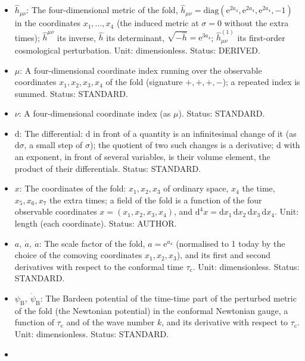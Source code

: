 \documentclass[
  10pt,
]{article}
\providecommand{\tightlist}{%
  \setlength{\itemsep}{0pt}\setlength{\parskip}{0pt}}
\begin{document}
\begin{itemize}
\tightlist
\item
  \(\hat h_{\mu\nu}\): The four-dimensional metric of the fold,
  \(\hat h_{\mu\nu} = \mathrm{diag}(\mathrm{e}^{2a_4}, \mathrm{e}^{2a_4}, \mathrm{e}^{2a_4}, -1)\)
  in the coordinates \(x_1, \dots, x_4\) (the induced metric at
  \(\sigma = 0\) without the extra times); \(\hat h^{\mu\nu}\) its
  inverse, \(\hat h\) its determinant,
  \(\sqrt{-\hat h} = \mathrm{e}^{3a_4}\); \(\hat h^{(1)}_{\mu\nu}\) its
  first-order cosmological perturbation. Unit: dimensionless. Status:
  DERIVED.
\item
  \(\mu\): A four-dimensional coordinate index running over the
  observable coordinates \(x_1, x_2, x_3, x_4\) of the fold (signature
  \(+,+,+,-\)); a repeated index is summed. Status: STANDARD.
\item
  \(\nu\): A four-dimensional coordinate index (as \(\mu\)). Status:
  STANDARD.
\item
  \(\mathrm{d}\): The differential: \(\mathrm{d}\) in front of a
  quantity is an infinitesimal change of it (as \(\mathrm{d}\sigma\), a
  small step of \(\sigma\)); the quotient of two such changes is a
  derivative; \(\mathrm{d}\) with an exponent, in front of several
  variables, is their volume element, the product of their
  differentials. Status: STANDARD.
\item
  \(x\): The coordinates of the fold: \(x_1, x_2, x_3\) of ordinary
  space, \(x_4\) the time, \(x_5, x_6, x_7\) the extra times; a field of
  the fold is a function of the four observable coordinates
  \(x = (x_1, x_2, x_3, x_4)\), and
  \(\mathrm{d}^4x = \mathrm{d}x_1\,\mathrm{d}x_2\,\mathrm{d}x_3\,\mathrm{d}x_4\).
  Unit: length (each coordinate). Status: AUTHOR.
\item
  \(a,\ \dot a,\ \ddot a\): The scale factor of the fold,
  \(a = \mathrm{e}^{a_4}\) (normalised to 1 today by the choice of the
  comoving coordinates \(x_1, x_2, x_3\)), and its first and second
  derivatives with respect to the conformal time \(\tau_{\mathrm{c}}\).
  Unit: dimensionless. Status: STANDARD.
\item
  \(\psi_{\mathrm{B}},\ \dot\psi_{\mathrm{B}}\): The Bardeen potential
  of the time-time part of the perturbed metric of the fold (the
  Newtonian potential) in the conformal Newtonian gauge, a function of
  \(\tau_{\mathrm{c}}\) and of the wave number \(k\), and its derivative
  with respect to \(\tau_{\mathrm{c}}\). Unit: dimensionless. Status:
  STANDARD.
\item

\end{itemize}
\end{document}
